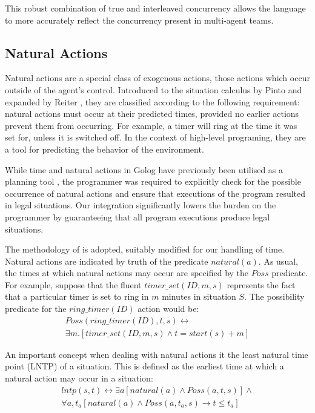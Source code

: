 \documentclass[letterpaper]{article}
\begin{document}
This robust combination of true and interleaved concurrency allows
the language to more accurately reflect the concurrency present in
multi-agent teams.


\subsection{Natural Actions}

Natural actions are a special class of exogenous actions, those actions
which occur outside of the agent's control. Introduced to the situation
calculus by Pinto \cite{pinto94temporal} and expanded by Reiter \cite{reiter96sc_nat_conc},
they are classified according to the following requirement: natural
actions must occur at their predicted times, provided no earlier actions
prevent them from occurring. For example, a timer will ring at the
time it was set for, unless it is switched off. In the context of
high-level programing, they are a tool for predicting the behavior
of the environment.

While time and natural actions in Golog have previously been utilised
as a planning tool \cite{pirri00planning_nat_acts}, the programmer
was required to explicitly check for the possible occurrence of natural
actions and ensure that executions of the program resulted in legal
situations. Our integration significantly lowers the burden on the
programmer by guaranteeing that all program executions produce legal
situations.

The methodology of \cite{reiter96sc_nat_conc} is adopted, suitably
modified for our handling of time. Natural actions are indicated by
truth of the predicate $natural(a)$. As usual, the times at which
natural actions may occur are specified by the $Poss$ predicate.
For example, suppose that the fluent $timer\_ set(ID,m,s)$ represents
the fact that a particular timer is set to ring in $m$ minutes in
situation $S$. The possibility predicate for the $ring\_ timer(ID)$
action would be:
\begin{multline}
Poss(ring\_ timer(ID),t,s)\leftrightarrow\\
\exists m.\left[timer\_ set(ID,m,s)\wedge t=start(s)+m\right]
\end{multline}

An important concept when dealing with natural actions it the least
natural time point (LNTP) of a situation. This is defined as the earliest
time at which a natural action may occur in a situation:
\begin{multline}
lntp(s,t)\leftrightarrow \exists a\left[natural(a)\wedge Poss(a,t,s)\right]\wedge\\
\forall a,t_{a}\left[natural(a)\wedge Poss(a,t_{a},s)\rightarrow t\leq t_{a}\right]
\end{multline}
\end{document}

